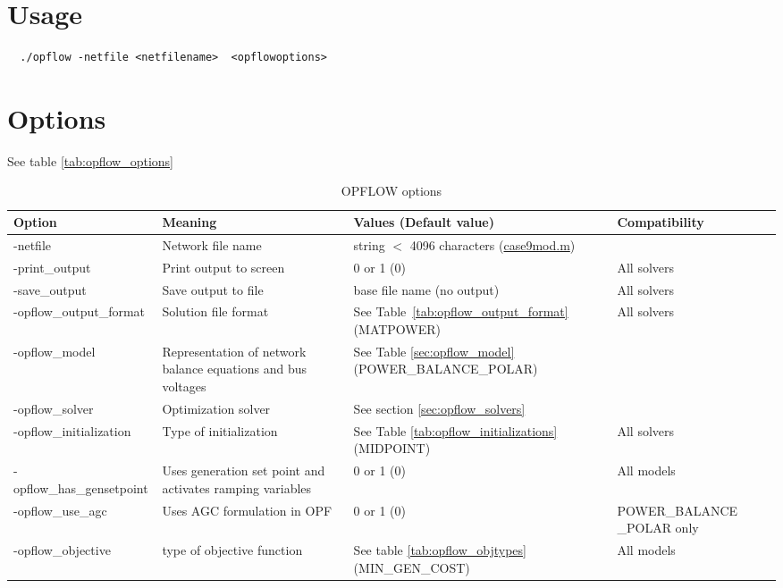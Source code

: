 \section{Usage}
\begin{lstlisting}
  ./opflow -netfile <netfilename>  <opflowoptions>
\end{lstlisting}

\section{Options}
See table \ref{tab:opflow_options}
\begin{table}[H]
  \caption{OPFLOW options}
  \small
  \begin{tabular}{|p{}|p{}|p{}|p{}|}
    \hline
    \textbf{Option} & \textbf{Meaning} & \textbf{Values (Default value)} & \textbf{Compatibility}\\ \hline
    -netfile & Network file name & string $<$ 4096 characters (\href{https://gitlab.pnnl.gov/exasgd/frameworks/exago/-/blob/master/datafiles/case9/case9mod.m}{case9mod.m}) & \\ \hline
    -print\_output & Print output to screen & 0 or 1 (0) & All solvers\\ \hline
    -save\_output & Save output to file & base file name (no output) & All solvers \\ \hline
    -opflow\_output\_format & Solution file format & See Table~\ref{tab:opflow_output_format} (MATPOWER) & All solvers \\ \hline
    -opflow\_model & Representation of network balance equations and bus voltages & See Table \ref{sec:opflow_model} (POWER\_BALANCE\_POLAR) & \\ \hline
    -opflow\_solver & Optimization solver & See section \ref{sec:opflow_solvers} & \\ \hline
    -opflow\_initialization & Type of initialization & See Table \ref{tab:opflow_initializations} (MIDPOINT) & All solvers \\ \hline
    -opflow\_has\_gensetpoint & Uses generation set point and activates ramping variables & 0 or 1 (0) & All models\\ \hline
    -opflow\_use\_agc & Uses AGC formulation in OPF & 0 or 1 (0) & POWER\_BALANCE \_POLAR only \\ \hline
    -opflow\_objective & type of objective function & See table \ref{tab:opflow_objtypes} (MIN\_GEN\_COST) & All models\\ \hline

\end{tabular}
\end{table}
